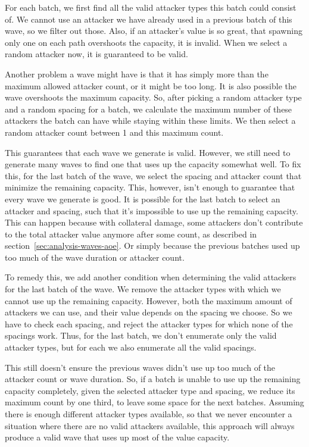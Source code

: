 For each batch, we first find all the valid attacker types this batch could consist of.
We cannot use an attacker we have already used in a previous batch of this wave, so we filter out those.
Also, if an attacker's value is so great, that spawning only one on each path overshoots the capacity, it is invalid.
When we select a random attacker now, it is guaranteed to be valid.

Another problem a wave might have is that it has simply more than the maximum allowed attacker count, or it might be too long.
It is also possible the wave overshoots the maximum capacity.
So, after picking a random attacker type and a random spacing for a batch, we calculate the maximum number of these attackers the batch can have while staying within these limits.
We then select a random attacker count between 1 and this maximum count.

This guarantees that each wave we generate is valid.
However, we still need to generate many waves to find one that uses up the capacity somewhat well.
To fix this, for the last batch of the wave, we select the spacing and attacker count that minimize the remaining capacity.
This, however, isn't enough to guarantee that every wave we generate is good.
It is possible for the last batch to select an attacker and spacing, such that it's impossible to use up the remaining capacity.
This can happen because with collateral damage, some attackers don't contribute to the total attacker value anymore after some count, as described in section~\ref{sec:analysis-waves-aoe}.
Or simply because the previous batches used up too much of the wave duration or attacker count.

To remedy this, we add another condition when determining the valid attackers for the last batch of the wave.
We remove the attacker types with which we cannot use up the remaining capacity.
However, both the maximum amount of attackers we can use, and their value depends on the spacing we choose.
So we have to check each spacing, and reject the attacker types for which none of the spacings work.
Thus, for the last batch, we don't enumerate only the valid attacker types, but for each we also enumerate all the valid spacings.

This still doesn't ensure the previous waves didn't use up too much of the attacker count or wave duration.
So, if a batch is unable to use up the remaining capacity completely, given the selected attacker type and spacing, we reduce its maximum count by one third, to leave some space for the next batches.
Assuming there is enough different attacker types available, so that we never encounter a situation where there are no valid attackers available, this approach will always produce a valid wave that uses up most of the value capacity.

